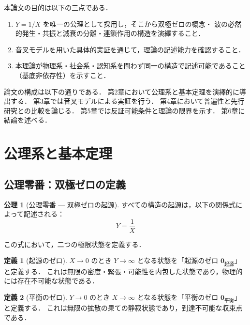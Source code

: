 \documentclass[12pt, a4paper]{article}
\theoremstyle{definition}
\newtheorem{axiom}{公理}
\newtheorem{definition}{定義}
\newcommand{\vorigin}{\mathbf{0}_{\text{起源}}}
\newcommand{\vequil}{\mathbf{0}_{\text{平衡}}}
\begin{document}
本論文の目的は以下の三点である．

\begin{enumerate}
  \item $Y = 1/X$ を唯一の公理として採用し，そこから双極ゼロの概念・
        波の必然的発生・共振と減衰の分離・連鎖作用の構造を演繹すること．
  \item 音叉モデルを用いた具体的実証を通じて，理論の記述能力を確認すること．
  \item 本理論が物理系・社会系・認知系を問わず同一の構造で記述可能であること
        （基底非依存性）を示すこと．
\end{enumerate}

論文の構成は以下の通りである．
第2章において公理系と基本定理を演繹的に導出する．
第3章では音叉モデルによる実証を行う．
第4章において普遍性と先行研究との比較を論じる．
第5章では反証可能条件と理論の限界を示す．
第6章に結論を述べる．

\section{公理系と基本定理}

\subsection{公理零番：双極ゼロの定義}

\begin{axiom}[公理零番 --- 双極ゼロの起源]
  すべての構造の起源は，以下の関係式によって記述される：
  \begin{equation}
    Y = \frac{1}{X}
    \label{eq:axiom0}
  \end{equation}
\end{axiom}

この式において，二つの極限状態を定義する．

\begin{definition}[起源のゼロ]
  $X \to 0$ のとき $Y \to \infty$ となる状態を「起源のゼロ $\vorigin$」と定義する．
  これは無限の密度・緊張・可能性を内包した状態であり，物理的には存在不可能な状態である．
\end{definition}

\begin{definition}[平衡のゼロ]
  $Y \to 0$ のとき $X \to \infty$ となる状態を「平衡のゼロ $\vequil$」と定義する．
  これは無限の拡散の果ての静寂状態であり，到達不可能な収束点である．
\end{definition}
\end{document}
